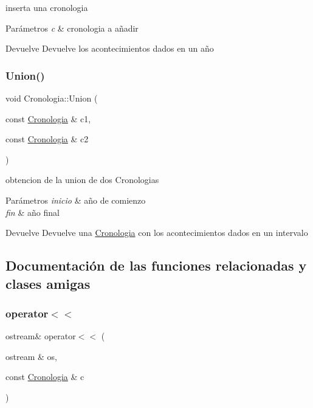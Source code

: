 inserta una cronologia 


\begin{DoxyParams}{Parámetros}
{\em c} & cronologia a añadir \\
\hline
\end{DoxyParams}
\begin{DoxyReturn}{Devuelve}
Devuelve los acontecimientos dados en un año 
\end{DoxyReturn}
\mbox{\label{classCronologia_a5dd879f6d755f01f3af65334bcabec0c}} 
\subsubsection{\texorpdfstring{Union()}{Union()}}
{\footnotesize\ttfamily void Cronologia\+::\+Union (\begin{DoxyParamCaption}\item[{const \hyperlink{classCronologia}{Cronologia} \&}]{c1,  }\item[{const \hyperlink{classCronologia}{Cronologia} \&}]{c2 }\end{DoxyParamCaption})}



obtencion de la union de dos Cronologias 


\begin{DoxyParams}{Parámetros}
{\em inicio} & año de comienzo \\
\hline
{\em fin} & año final \\
\hline
\end{DoxyParams}
\begin{DoxyReturn}{Devuelve}
Devuelve una \hyperlink{classCronologia}{Cronologia} con los acontecimientos dados en un intervalo 
\end{DoxyReturn}


\subsection{Documentación de las funciones relacionadas y clases amigas}
\mbox{\label{classCronologia_a5a590e2ec95cc4489c3de5b03e2cac4c}} 
\subsubsection{\texorpdfstring{operator$<$$<$}{operator<<}}
{\footnotesize\ttfamily ostream\& operator$<$$<$ (\begin{DoxyParamCaption}\item[{ostream \&}]{os,  }\item[{const \hyperlink{classCronologia}{Cronologia} \&}]{c }\end{DoxyParamCaption})\hspace{0.3cm}{\ttfamily [friend]}}



